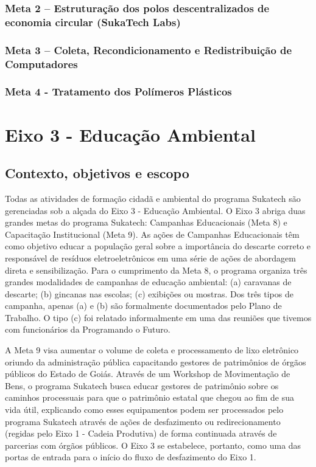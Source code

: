 \documentclass[
	12pt,				%
	openright,			%
	twoside,			%
	a4paper,			%
	english,			%
	french,				%
	spanish,			%
	brazil,				%
	]{abntex2}
\begin{document}
\subsection*{Meta 2 – Estruturação dos polos descentralizados de economia circular (SukaTech Labs)}

\subsection*{Meta 3 – Coleta, Recondicionamento e Redistribuição de Computadores}

\subsection*{Meta 4 - Tratamento dos Polímeros Plásticos}



\chapter{Eixo 3 - Educação Ambiental}
\section{Contexto, objetivos e escopo}

Todas as atividades de formação cidadã e ambiental do programa Sukatech são gerenciadas sob a alçada do Eixo 3 - Educação Ambiental. O Eixo 3 abriga duas grandes metas do programa Sukatech: Campanhas Educacionais (Meta 8) e Capacitação Institucional (Meta 9). As ações de Campanhas Educacionais têm como objetivo educar a população geral sobre a importância do descarte correto e responsável de resíduos eletroeletrônicos em uma série de ações de abordagem direta e sensibilização. Para o cumprimento da Meta 8, o programa organiza três grandes modalidades de campanhas de educação ambiental: (a) caravanas de descarte; (b) gincanas nas escolas; (c) exibições ou mostras. Dos três tipos de campanha, apenas (a) e (b) são formalmente documentados pelo Plano de Trabalho. O tipo (c) foi relatado informalmente em uma das reuniões que tivemos com funcionários da Programando o Futuro.

A Meta 9 visa aumentar o volume de coleta e processamento de lixo eletrônico oriundo da administração pública capacitando gestores de patrimônios de órgãos públicos do Estado de Goiás. Através de um Workshop de Movimentação de Bens, o programa Sukatech busca educar gestores de patrimônio sobre os caminhos processuais para que o patrimônio estatal que chegou ao fim de sua vida útil, explicando como esses equipamentos podem ser processados pelo programa Sukatech através de ações de desfazimento ou redirecionamento (regidas pelo Eixo 1 - Cadeia Produtiva) de forma continuada através de parcerias com órgãos públicos. O Eixo 3 se estabelece, portanto, como uma das portas de entrada para o início do fluxo de desfazimento do Eixo 1.
\end{document}
